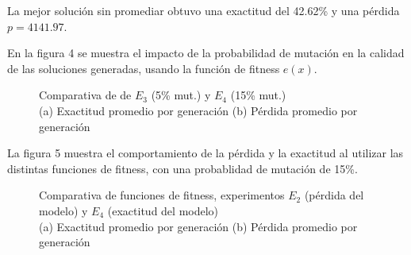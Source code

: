 \documentclass[conference]{IEEEtran}
\begin{document}
La mejor solución sin promediar obtuvo una exactitud del 42.62\% y una pérdida $p = 4141.97$. 

En la figura 4 se muestra el impacto de la probabilidad de mutación en la calidad de las soluciones generadas, usando la función de fitness $e(x)$.
\begin{figure}[h]
\begin{centering}
\begin{subfigure}{.25\textwidth}
   \begin{centering}
	\scalebox{0.35}{}
	\end{centering}
    \caption{}
    \label{}\end{subfigure}%
\begin{subfigure}{.25\textwidth}
  \begin{centering}
	\scalebox{0.35}{}
	\end{centering}
    \caption{}
    \label{}
\end{subfigure}
\end{centering}
\caption{Comparativa de  de $E_3$ (5\% mut.) y $E_4$ (15\% mut.)\\(a) Exactitud promedio por generación (b) Pérdida promedio por generación}
\label{figure:comparision_fitness}
\end{figure}

La figura 5 muestra el comportamiento de la pérdida y la exactitud al utilizar las distintas funciones de fitness, con una probablidad de mutación de 15\%.
\begin{figure}[h]
\begin{centering}
\begin{subfigure}{.25\textwidth}
   \begin{centering}
	\scalebox{0.35}{}
	\end{centering}
    \caption{}
    \label{}\end{subfigure}%
\begin{subfigure}{.25\textwidth}
  \begin{centering}
	\scalebox{0.35}{}
	\end{centering}
    \caption{}
    \label{}
\end{subfigure}
\end{centering}
\caption{Comparativa de funciones de fitness, experimentos $E_2$ (pérdida del modelo) y $E_4$ (exactitud del modelo)\\(a) Exactitud promedio por generación (b) Pérdida promedio por generación}
\label{}
\end{figure}
\end{document}
